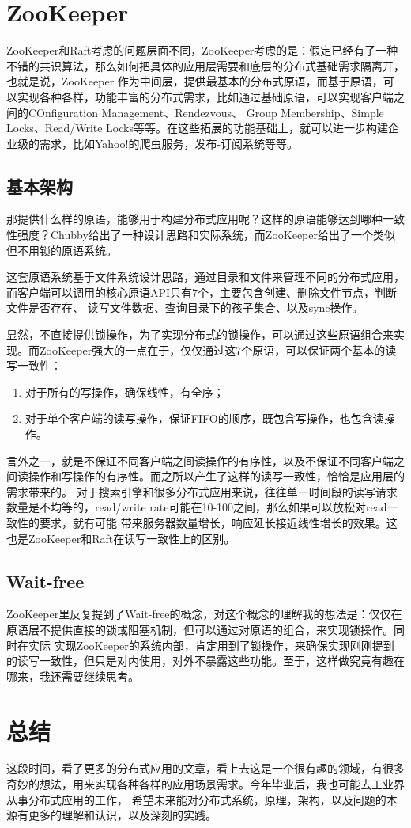 \documentclass[UTF8]{article}
\begin{document}
\section{ZooKeeper}
ZooKeeper和Raft考虑的问题层面不同，ZooKeeper考虑的是：假定已经有了一种不错的共识算法，那么如何把具体的应用层需要和底层的分布式基础需求隔离开，也就是说，ZooKeeper
作为中间层，提供最基本的分布式原语，而基于原语，可以实现各种各样，功能丰富的分布式需求，比如通过基础原语，可以实现客户端之间的COnfiguration Management、Rendezvous、
Group Membership、Simple Locks、Read/Write Locks等等。在这些拓展的功能基础上，就可以进一步构建企业级的需求，比如Yahoo!的爬虫服务，发布-订阅系统等等。

\subsection{基本架构}
那提供什么样的原语，能够用于构建分布式应用呢？这样的原语能够达到哪种一致性强度？Chubby给出了一种设计思路和实际系统，而ZooKeeper给出了一个类似但不用锁的原语系统。

这套原语系统基于文件系统设计思路，通过目录和文件来管理不同的分布式应用，而客户端可以调用的核心原语API只有7个，主要包含创建、删除文件节点，判断文件是否存在、
读写文件数据、查询目录下的孩子集合、以及sync操作。

显然，不直接提供锁操作，为了实现分布式的锁操作，可以通过这些原语组合来实现。而ZooKeeper强大的一点在于，仅仅通过这7个原语，可以保证两个基本的读写一致性：
\begin{enumerate}
    \item 对于所有的写操作，确保线性，有全序；
    \item 对于单个客户端的读写操作，保证FIFO的顺序，既包含写操作，也包含读操作。
\end{enumerate}

言外之一，就是不保证不同客户端之间读操作的有序性，以及不保证不同客户端之间读操作和写操作的有序性。而之所以产生了这样的读写一致性，恰恰是应用层的需求带来的。
对于搜索引擎和很多分布式应用来说，往往单一时间段的读写请求数量是不均等的，read/write rate可能在10-100之间，那么如果可以放松对read一致性的要求，就有可能
带来服务器数量增长，响应延长接近线性增长的效果。这也是ZooKeeper和Raft在读写一致性上的区别。

\subsection{Wait-free}
ZooKeeper里反复提到了Wait-free的概念，对这个概念的理解我的想法是：仅仅在原语层不提供直接的锁或阻塞机制，但可以通过对原语的组合，来实现锁操作。同时在实际
实现ZooKeeper的系统内部，肯定用到了锁操作，来确保实现刚刚提到的读写一致性，但只是对内使用，对外不暴露这些功能。至于，这样做究竟有趣在哪来，我还需要继续思考。

\section{总结}
这段时间，看了更多的分布式应用的文章，看上去这是一个很有趣的领域，有很多奇妙的想法，用来实现各种各样的应用场景需求。今年毕业后，我也可能去工业界从事分布式应用的工作，
希望未来能对分布式系统，原理，架构，以及问题的本源有更多的理解和认识，以及深刻的实践。
\end{document}
